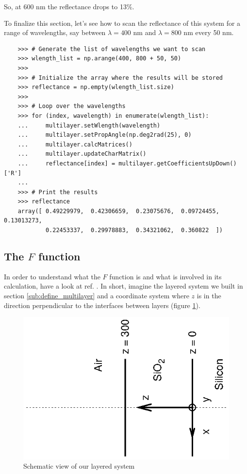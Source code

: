 \documentclass[a4paper,11pt,aps,final]{revtex4}
\begin{document}
So, at 600 nm the reflectance drops to 13\%.

To finalize this section, let's see how to scan the reflectance of this system for a range of wavelengths, say between $\lambda = 400$ nm and $\lambda = 800$ nm every 50 nm.
\begin{verbatim}
    >>> # Generate the list of wavelengths we want to scan
    >>> wlength_list = np.arange(400, 800 + 50, 50)
    >>>
    >>> # Initialize the array where the results will be stored
    >>> reflectance = np.empty(wlength_list.size)
    >>>
    >>> # Loop over the wavelengths
    >>> for (index, wavelength) in enumerate(wlength_list):
    ...     multilayer.setWlength(wavelength)
    ...     multilayer.setPropAngle(np.deg2rad(25), 0)
    ...     multilayer.calcMatrices()
    ...     multilayer.updateCharMatrix()
    ...     reflectance[index] = multilayer.getCoefficientsUpDown()['R']
    ...
    >>> # Print the results
    >>> reflectance
    array([ 0.49229979,  0.42306659,  0.23075676,  0.09724455,  0.13013273,
            0.22453337,  0.29978883,  0.34321062,  0.360822  ])
\end{verbatim}

\subsection{The $F$ function} \label{sub:ffunction}
In order to understand what the $F$ function is and what is involved in its calculation, have a look at ref. \cite{crawford88}. In short, imagine the layered system we built in section \ref{sub:define_multilayer} and a coordinate system where $z$ is in the direction perpendicular to the interfaces between layers (figure \ref{fig:diagram}).
\begin{figure}
    \centering
    \includegraphics[scale=1,angle=-90]{figure.ps}
    \caption{Schematic view of our layered system}
    \label{fig:diagram}
\end{figure}
\end{document}

